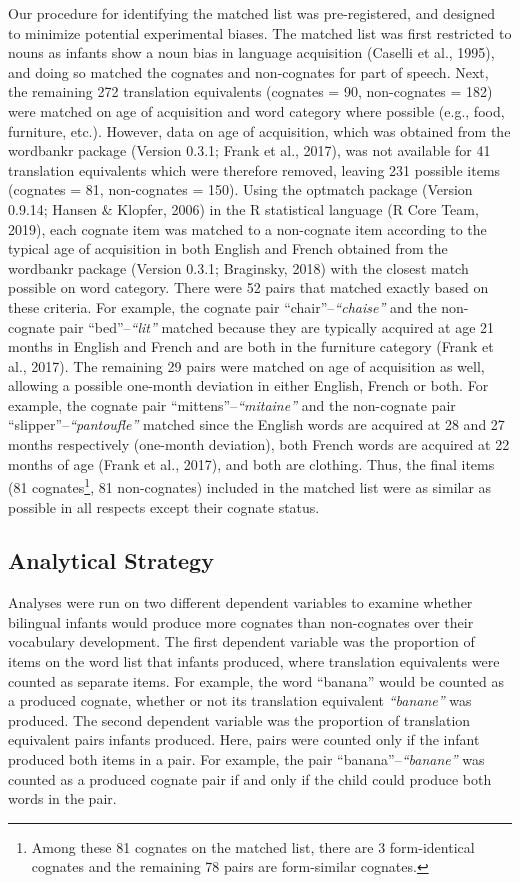 \documentclass[
  ,man,floatsintext]{apa6}
\begin{document}
Our procedure for identifying the matched list was pre-registered, and designed to minimize potential experimental biases. The matched list was first restricted to nouns as infants show a noun bias in language acquisition (Caselli et al., 1995), and doing so matched the cognates and non-cognates for part of speech. Next, the remaining 272 translation equivalents (cognates = 90, non-cognates = 182) were matched on age of acquisition and word category where possible (e.g., food, furniture, etc.). However, data on age of acquisition, which was obtained from the wordbankr package (Version 0.3.1; Frank et al., 2017), was not available for 41 translation equivalents which were therefore removed, leaving 231 possible items (cognates = 81, non-cognates = 150). Using the optmatch package (Version 0.9.14; Hansen \& Klopfer, 2006) in the R statistical language (R Core Team, 2019), each cognate item was matched to a non-cognate item according to the typical age of acquisition in both English and French obtained from the wordbankr package (Version 0.3.1; Braginsky, 2018) with the closest match possible on word category. There were 52 pairs that matched exactly based on these criteria. For example, the cognate pair ``chair''--\emph{``chaise''} and the non-cognate pair ``bed''--\emph{``lit''} matched because they are typically acquired at age 21 months in English and French and are both in the furniture category (Frank et al., 2017). The remaining 29 pairs were matched on age of acquisition as well, allowing a possible one-month deviation in either English, French or both. For example, the cognate pair ``mittens''--\emph{``mitaine''} and the non-cognate pair ``slipper''--\emph{``pantoufle''} matched since the English words are acquired at 28 and 27 months respectively (one-month deviation), both French words are acquired at 22 months of age (Frank et al., 2017), and both are clothing. Thus, the final items (81 cognates\footnote{Among these 81 cognates on the matched list, there are 3 form-identical cognates and the remaining 78 pairs are form-similar cognates.}, 81 non-cognates) included in the matched list were as similar as possible in all respects except their cognate status.

\hypertarget{analytical-strategy}{%
\subsection{Analytical Strategy}\label{analytical-strategy}}

Analyses were run on two different dependent variables to examine whether bilingual infants would produce more cognates than non-cognates over their vocabulary development. The first dependent variable was the proportion of items on the word list that infants produced, where translation equivalents were counted as separate items. For example, the word ``banana'' would be counted as a produced cognate, whether or not its translation equivalent \emph{``banane''} was produced. The second dependent variable was the proportion of translation equivalent pairs infants produced. Here, pairs were counted only if the infant produced both items in a pair. For example, the pair ``banana''--\emph{``banane''} was counted as a produced cognate pair if and only if the child could produce both words in the pair.
\end{document}

